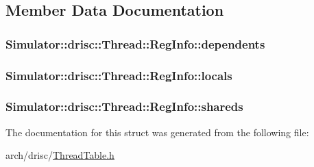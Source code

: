 \subsection{Member Data Documentation}
\hypertarget{struct_simulator_1_1drisc_1_1_thread_1_1_reg_info_a79a19b90bdf8773d7a0d9b37f95d980a}{
\subsubsection[{dependents}]{ Simulator\+::drisc\+::\+Thread\+::\+Reg\+Info\+::dependents}}\label{struct_simulator_1_1drisc_1_1_thread_1_1_reg_info_a79a19b90bdf8773d7a0d9b37f95d980a}
\hypertarget{struct_simulator_1_1drisc_1_1_thread_1_1_reg_info_a604f9c620d2d35ec92ed1c5ea2030a56}{
\subsubsection[{locals}]{ Simulator\+::drisc\+::\+Thread\+::\+Reg\+Info\+::locals}}\label{struct_simulator_1_1drisc_1_1_thread_1_1_reg_info_a604f9c620d2d35ec92ed1c5ea2030a56}
\hypertarget{struct_simulator_1_1drisc_1_1_thread_1_1_reg_info_a60537a9dc0ff0247a4bcf54b140a10be}{
\subsubsection[{shareds}]{ Simulator\+::drisc\+::\+Thread\+::\+Reg\+Info\+::shareds}}\label{struct_simulator_1_1drisc_1_1_thread_1_1_reg_info_a60537a9dc0ff0247a4bcf54b140a10be}


The documentation for this struct was generated from the following file\+:\begin{DoxyCompactItemize}
\item 
arch/drisc/\hyperlink{_thread_table_8h}{Thread\+Table.\+h}\end{DoxyCompactItemize}
